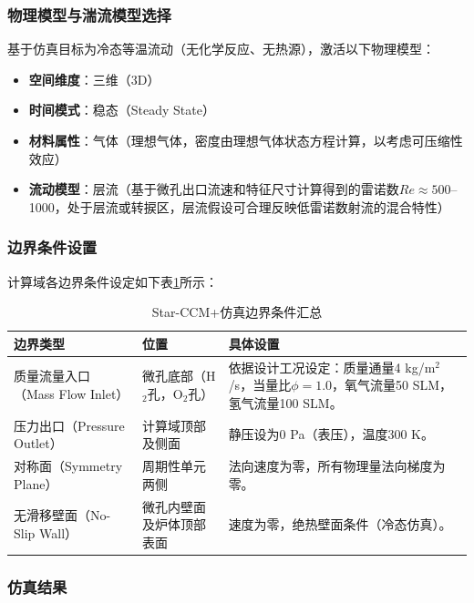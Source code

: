 \subsubsection{物理模型与湍流模型选择}

基于仿真目标为冷态等温流动（无化学反应、无热源），激活以下物理模型：

\begin{itemize}
	\item \textbf{空间维度}：三维（3D）
	\item \textbf{时间模式}：稳态（Steady State）
	\item \textbf{材料属性}：气体（理想气体，密度由理想气体状态方程计算，以考虑可压缩性效应）
	\item \textbf{流动模型}：层流（基于微孔出口流速和特征尺寸计算得到的雷诺数$Re \approx 500$--1000，处于层流或转捩区，层流假设可合理反映低雷诺数射流的混合特性）
\end{itemize}

\subsubsection{边界条件设置}

计算域各边界条件设定如下表\ref{tab:simulation_bc}所示：

\begin{table}[H]
	\centering
	\caption{Star-CCM+仿真边界条件汇总}
	\label{tab:simulation_bc}
	\begin{tabular}{p{4cm}p{4.5cm}p{6cm}}
		\toprule
		\textbf{边界类型} & \textbf{位置} & \textbf{具体设置} \\
		\midrule
		质量流量入口（Mass Flow Inlet） & 微孔底部（H$_2$孔，O$_2$孔） & 依据设计工况设定：质量通量4 kg/m$^2$/s，当量比$\phi=1.0$，氧气流量50 SLM，氢气流量100 SLM。 \\
		压力出口（Pressure Outlet） & 计算域顶部及侧面 & 静压设为0 Pa（表压），温度300 K。 \\
		对称面（Symmetry Plane） & 周期性单元两侧 & 法向速度为零，所有物理量法向梯度为零。 \\
		无滑移壁面（No-Slip Wall） & 微孔内壁面及炉体顶部表面 & 速度为零，绝热壁面条件（冷态仿真）。 \\
		\bottomrule
	\end{tabular}
\end{table}

\subsubsection{仿真结果}

